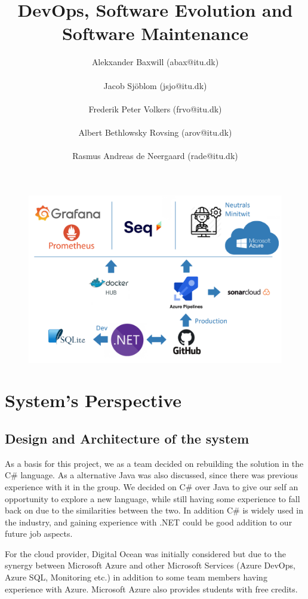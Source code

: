 \documentclass{article}
\title{DevOps, Software Evolution and Software Maintenance}
\author{Alekxander Baxwill (abax@itu.dk)\\ \\ Jacob Sjöblom (jsjo@itu.dk) \\ \\ Frederik Peter Volkers (frvo@itu.dk) \\ \\ Albert Bethlowsky Rovsing (arov@itu.dk) \\ \\ Rasmus Andreas de Neergaard (rade@itu.dk)}
\begin{document}
\maketitle

\begin{figure}[H]
\centering
\includegraphics[width=1\textwidth]{images/SystemDesign.png}
\end{figure}

\newpage
\section{System's Perspective}
\subsection{Design and Architecture of the system}
As a basis for this project, we as a team decided on rebuilding the solution in the C# language. As a alternative Java was also discussed, since there was previous experience with it in the group. We decided on C# over Java to give our self an opportunity to explore a new language, while still having some experience to fall back on due to the similarities between the two. In addition C# is widely used in the industry, and gaining experience with .NET could be good addition to our future job aspects.

For the cloud provider, Digital Ocean was initially considered but due to the synergy between Microsoft Azure and other Microsoft Services (Azure DevOps, Azure SQL, Monitoring etc.) in addition to some team members having experience with Azure. Microsoft Azure also provides students with free credits.
\end{document}
